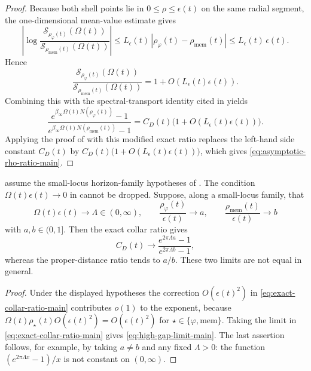 \begin{proof}
Because both shell points lie in $0\le\rho\le\epsilon(t)$ on the same radial segment, the one-dimensional mean-value estimate gives
\[
\left|
\log\frac{\mathcal S_{\rho_\varphi(t)}(\Omega(t))}
         {\mathcal S_{\rho_{\mathrm{mem}}(t)}(\Omega(t))}
\right|
\le
L_\epsilon(t)\,|\rho_\varphi(t)-\rho_{\mathrm{mem}}(t)|
\le
L_\epsilon(t)\,\epsilon(t).
\]
Hence
\[
\frac{\mathcal S_{\rho_\varphi(t)}(\Omega(t))}
     {\mathcal S_{\rho_{\mathrm{mem}}(t)}(\Omega(t))}
=
1+O(L_\epsilon(t)\epsilon(t)).
\]
Combining this with the spectral-transport identity cited in
 yields
\[
\frac{e^{\beta_\infty\Omega(t) N(\rho_\varphi(t))}-1}
     {e^{\beta_\infty\Omega(t) N(\rho_{\mathrm{mem}}(t))}-1}
=
C_D(t)\bigl(1+O(L_\epsilon(t)\epsilon(t))\bigr).
\]
Applying the proof of  with this modified exact ratio replaces the left-hand side constant $C_D(t)$ by
$C_D(t)\bigl(1+O(L_\epsilon(t)\epsilon(t))\bigr)$, which gives
\eqref{eq:asymptotic-rho-ratio-main}.
\end{proof}

\begin{lemma}\label{lem:high-gap-obstruction-main}
\ModelAClause assume the small-locus horizon-family hypotheses of
. The condition
$\Omega(t)\epsilon(t)\to0$ in
 cannot be dropped. Suppose, along a small-locus
family, that
\[
\Omega(t)\epsilon(t)\to\Lambda\in(0,\infty),\qquad
\frac{\rho_\varphi(t)}{\epsilon(t)}\to a,\qquad
\frac{\rho_{\mathrm{mem}}(t)}{\epsilon(t)}\to b
\]
with $a,b\in(0,1]$. Then the exact collar ratio gives
\begin{equation}\label{eq:high-gap-limit-main}
C_D(t)\longrightarrow
\frac{e^{2\pi\Lambda a}-1}{e^{2\pi\Lambda b}-1},
\end{equation}
whereas the proper-distance ratio tends to $a/b$. These two limits are not equal
in general.
\end{lemma}

\begin{proof}
Under the displayed hypotheses the correction
$O(\epsilon(t)^2)$ in \eqref{eq:exact-collar-ratio-main} contributes
$o(1)$ to the exponent, because
$\Omega(t)\rho_\star(t)O(\epsilon(t)^2)=O(\epsilon(t)^2)$ for
$\star\in\{\varphi,\mathrm{mem}\}$. Taking the limit in
\eqref{eq:exact-collar-ratio-main} gives \eqref{eq:high-gap-limit-main}. The
last assertion follows, for example, by taking $a\ne b$ and any fixed
$\Lambda>0$: the function $(e^{2\pi\Lambda x}-1)/x$ is not constant on
$(0,\infty)$.
\end{proof}

